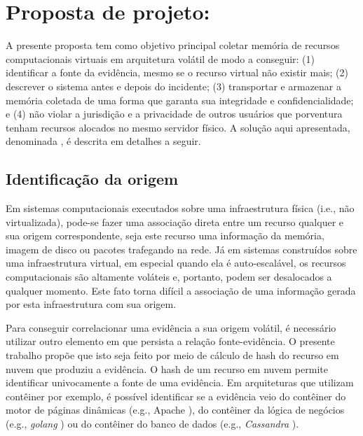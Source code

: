 \chapter{Proposta de projeto: \fancyname}
\label{chp:proposta}

A presente proposta tem como objetivo principal coletar memória de recursos computacionais virtuais em arquitetura volátil de modo a conseguir: 
(1) identificar a fonte da evidência, mesmo se o recurso virtual não existir mais; 
(2) descrever o sistema antes e depois do incidente;
(3) transportar e armazenar a memória coletada de uma forma que garanta sua integridade e confidencialidade; e
(4) não violar a jurisdição e a privacidade de outros usuários que porventura tenham recursos alocados no mesmo servidor físico.
%
A solução aqui apresentada, denominada \fancyname, é descrita em detalhes a seguir.

\section{Identificação da origem}
\label{sec:proposal-desc-origin}

Em sistemas computacionais executados sobre uma infraestrutura física (i.e., não virtualizada), pode-se fazer uma associação direta entre um recurso qualquer e sua origem correspondente, seja este recurso uma informação da memória, imagem de disco ou pacotes trafegando na rede.
%
Já em sistemas construídos sobre uma infraestrutura virtual, em especial quando ela é auto-escalável, os recursos computacionais são altamente voláteis e, portanto, podem ser desalocados a qualquer momento.
%
Este fato torna difícil a associação de uma informação gerada por esta infraestrutura com sua origem.


Para conseguir correlacionar uma evidência a sua origem volátil, é necessário utilizar outro elemento em que persista a relação fonte-evidência.
%
O presente trabalho propõe que isto seja feito por meio de cálculo de hash do recurso em nuvem que produziu a evidência. %
%
%
O hash de um recurso em nuvem permite identificar univocamente a fonte de uma evidência. Em arquiteturas que utilizam contêiner por exemplo, é possível identificar se a evidência veio do contêiner do motor de páginas dinâmicas (e.g., Apache%
), do contêiner da lógica de negócios (e.g., \textit{golang}%
) ou do contêiner do banco de dados (e.g., \textit{Cassandra}%
). %

